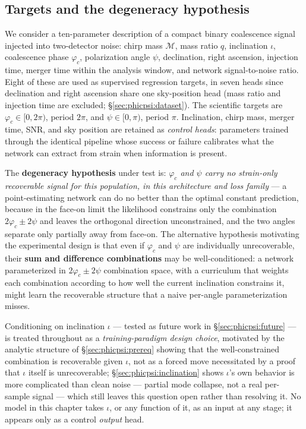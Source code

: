 \subsection{Targets and the degeneracy hypothesis}
\label{sec:phicpsi:targets}

We consider a ten-parameter description of a compact binary coalescence signal injected into two-detector noise: chirp mass $\mathcal{M}$, mass ratio $q$, inclination $\iota$, coalescence phase $\varphi_c$, polarization angle $\psi$, declination, right ascension, injection time, merger time within the analysis window, and network signal-to-noise ratio.
Eight of these are used as supervised regression targets, in seven heads since declination and right ascension share one sky-position head (mass ratio and injection time are excluded; \S\ref{sec:phicpsi:dataset}).
The scientific targets are $\varphi_c \in [0, 2\pi)$, period $2\pi$, and $\psi \in [0, \pi)$, period $\pi$.
Inclination, chirp mass, merger time, SNR, and sky position are retained as \emph{control heads}: parameters trained through the identical pipeline whose success or failure calibrates what the network can extract from strain when information is present.

The \textbf{degeneracy hypothesis} under test is: \emph{$\varphi_c$ and $\psi$ carry no strain-only recoverable signal for this population, in this architecture and loss family} --- a point-estimating network can do no better than the optimal constant prediction, because in the face-on limit the likelihood constrains only the combination $2\varphi_c \pm 2\psi$ and leaves the orthogonal direction unconstrained, and the two angles separate only partially away from face-on.
The alternative hypothesis motivating the experimental design is that even if $\varphi_c$ and $\psi$ are individually unrecoverable, their \textbf{sum and difference combinations} may be well-conditioned: a network parameterized in $2\varphi_c \pm 2\psi$ combination space, with a curriculum that weights each combination according to how well the current inclination constrains it, might learn the recoverable structure that a naive per-angle parameterization misses.

Conditioning on inclination $\iota$ --- tested as future work in \S\ref{sec:phicpsi:future} --- is treated throughout as a \emph{training-paradigm design choice}, motivated by the analytic structure of \S\ref{sec:phicpsi:prereq} showing that the well-constrained combination is recoverable given $\iota$, not as a forced move necessitated by a proof that $\iota$ itself is unrecoverable; \S\ref{sec:phicpsi:inclination} shows $\iota$'s own behavior is more complicated than clean noise --- partial mode collapse, not a real per-sample signal --- which still leaves this question open rather than resolving it.
No model in this chapter takes $\iota$, or any function of it, as an input at any stage; it appears only as a control \emph{output} head.

